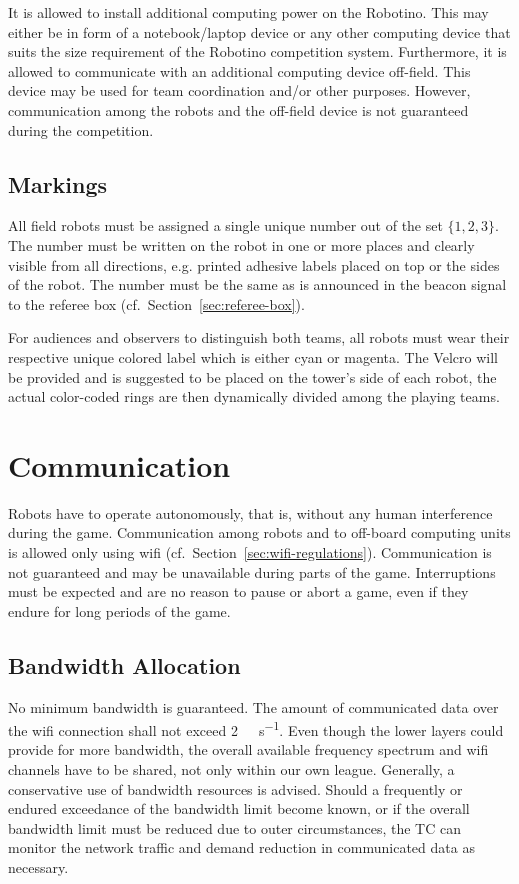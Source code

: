 \documentclass[12pt,twoside]{article}
\newcommand{\Robotino}{Robotino}
\newcommand{\refsec}[1]{Section~\ref{#1}}
\begin{document}
It is allowed to install additional computing power on the
\Robotino. This may either be in form of a notebook/laptop device or
any other computing device that suits the size requirement of the
\Robotino{} competition system. Furthermore, it is allowed to
communicate with an additional computing device off-field. This device
may be used for team coordination and/or other purposes. However,
communication among the robots and the off-field device is not
guaranteed during the competition.

\subsection{Markings}
\label{sec:robot-markings}
All field robots must be assigned a single unique number out of the
set $\{1, 2, 3\}$. The number must be written on the robot in one or
more places and clearly visible from all directions, e.g. printed
adhesive labels placed on top or the sides of the robot. The number
must be the same as is announced in the beacon signal to the referee
box (cf.~\refsec{sec:referee-box}).

For audiences and observers to distinguish both teams, all robots must 
wear their respective unique colored label which is either cyan or magenta. 
The Velcro will be provided and is suggested to be placed on the tower's side 
of each robot, the actual color-coded rings are then dynamically divided among 
the playing teams.

\section{Communication}
\label{sec:communication}

Robots have to operate autonomously, that is, without any human
interference during the game. Communication among robots and to
off-board computing units is allowed only using wifi
(cf.~\refsec{sec:wifi-regulations}). Communication is not guaranteed
and may be unavailable during parts of the game. Interruptions must be
expected and are no reason to pause or abort a game, even if they
endure for long periods of the game.

\subsection{Bandwidth Allocation}
\label{sec:bandwidth}
No minimum bandwidth is guaranteed. The amount of communicated data
over the wifi connection shall not exceed
\SI[per-mode=symbol]{2}{\mega\bit\per\second}. Even though the lower
layers could provide for more bandwidth, the overall available
frequency spectrum and wifi channels have to be shared, not only
within our own league. Generally, a conservative use of bandwidth
resources is advised. Should a frequently or endured exceedance of the
bandwidth limit become known, or if the overall bandwidth limit must
be reduced due to outer circumstances, the TC can monitor the network
traffic and demand reduction in communicated data as necessary.
\end{document}
